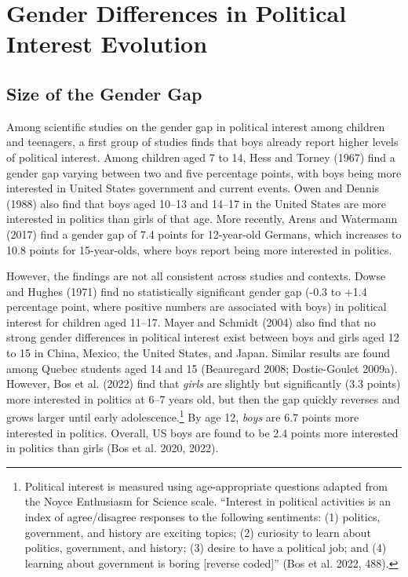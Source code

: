 \documentclass[
  letterpaper,
  DIV=11,
  numbers=noendperiod]{scrreprt}
\begin{document}
\section{Gender Differences in Political Interest
Evolution}\label{gender-differences-in-political-interest-evolution}

\subsection{Size of the Gender Gap}\label{size-of-the-gender-gap}

Among scientific studies on the gender gap in political interest among
children and teenagers, a first group of studies finds that boys already
report higher levels of political interest. Among children aged 7 to 14,
Hess and Torney (1967) find a gender gap varying between two and five
percentage points, with boys being more interested in United States
government and current events. Owen and Dennis (1988) also find that
boys aged 10--13 and 14--17 in the United States are more interested in
politics than girls of that age. More recently, Arens and Watermann
(2017) find a gender gap of 7.4 points for 12-year-old Germans, which
increases to 10.8 points for 15-year-olds, where boys report being more
interested in politics.

However, the findings are not all consistent across studies and
contexts. Dowse and Hughes (1971) find no statistically significant
gender gap (-0.3 to +1.4 percentage point, where positive numbers are
associated with boys) in political interest for children aged 11--17.
Mayer and Schmidt (2004) also find that no strong gender differences in
political interest exist between boys and girls aged 12 to 15 in China,
Mexico, the United States, and Japan. Similar results are found among
Quebec students aged 14 and 15 (Beauregard 2008; Dostie-Goulet 2009a).
However, Bos et al. (2022) find that \emph{girls} are slightly but
significantly (3.3 points) more interested in politics at 6--7 years
old, but then the gap quickly reverses and grows larger until early
adolescence.\footnote{Political interest is measured using
  age-appropriate questions adapted from the Noyce Enthusiasm for
  Science scale. ``Interest in political activities is an index of
  agree/disagree responses to the following sentiments: (1) politics,
  government, and history are exciting topics; (2) curiosity to learn
  about politics, government, and history; (3) desire to have a
  political job; and (4) learning about government is boring {[}reverse
  coded{]}'' (Bos et al. 2022, 488).} By age 12, \emph{boys} are 6.7
points more interested in politics. Overall, US boys are found to be 2.4
points more interested in politics than girls (Bos et al. 2020, 2022).
\end{document}

